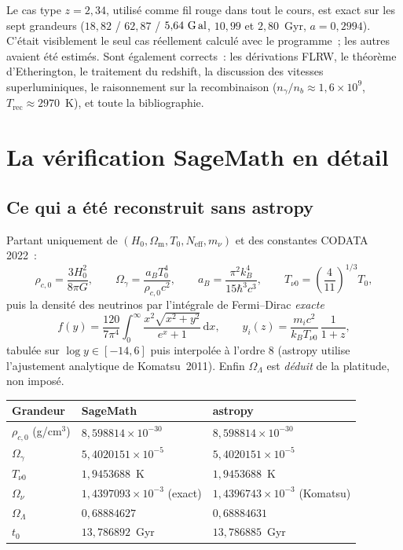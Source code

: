 \documentclass[11pt,a4paper]{report}
\newcommand{\Gly}{\text{G\,al}}
\newcommand{\dif}{\mathrm{d}}
\newcommand{\Om}{\Omega_{\mathrm{m}}}
\newcommand{\OL}{\Omega_{\Lambda}}
\newcommand{\Hzero}{H_{0}}
\begin{document}
\begin{tcolorbox}[ok,title={Ce qui était juste}]
Le cas type $z = 2{,}34$, utilisé comme fil rouge dans tout le cours, est
exact sur les sept grandeurs ($18{,}82$ / $62{,}87$ / $5{,}64~\Gly$, $10{,}99$
et $2{,}80$~Gyr, $a = 0{,}2994$). C'était visiblement le seul cas
réellement calculé avec le programme~; les autres avaient été estimés.
Sont également corrects~: les dérivations FLRW, le théorème d'Etherington, le
traitement du redshift, la discussion des vitesses superluminiques, le
raisonnement sur la recombinaison ($n_{\gamma}/n_{b}\approx1{,}6\times10^{9}$,
$T_{\text{rec}}\approx2970$~K), et toute la bibliographie.
\end{tcolorbox}

\chapter{La vérification SageMath en détail}

\section{Ce qui a été reconstruit sans astropy}

Partant uniquement de $(\Hzero, \Om, T_{0}, N_{\text{eff}}, m_{\nu})$ et des
constantes CODATA 2022~:
\[
\rho_{c,0} = \frac{3\Hzero^{2}}{8\pi G},\qquad
\Omega_{\gamma} = \frac{a_{B}T_{0}^{4}}{\rho_{c,0}c^{2}},\qquad
a_{B} = \frac{\pi^{2}k_{B}^{4}}{15\hbar^{3}c^{3}},\qquad
T_{\nu0} = \left(\frac{4}{11}\right)^{1/3}T_{0},
\]
puis la densité des neutrinos par l'intégrale de Fermi--Dirac \emph{exacte}
\[
f(y) = \frac{120}{7\pi^{4}}\int_{0}^{\infty}
       \frac{x^{2}\sqrt{x^{2}+y^{2}}}{e^{x}+1}\,\dif x ,
\qquad y_{i}(z) = \frac{m_{i}c^{2}}{k_{B}T_{\nu0}}\,\frac{1}{1+z} ,
\]
tabulée sur $\log y \in [-14, 6]$ puis interpolée à l'ordre 8 (astropy utilise
l'ajustement analytique de Komatsu~2011). Enfin $\OL$ est \emph{déduit} de la
platitude, non imposé.

\begin{center}
\renewcommand{\arraystretch}{1.25}
\begin{tabular}{lll}
\toprule
\textbf{Grandeur} & \textbf{SageMath} & \textbf{astropy} \\
\midrule
$\rho_{c,0}$ (g/cm$^{3}$) & $8{,}598814\times10^{-30}$ & $8{,}598814\times10^{-30}$ \\
$\Omega_{\gamma}$ & $5{,}4020151\times10^{-5}$ & $5{,}4020151\times10^{-5}$ \\
$T_{\nu0}$ & $1{,}9453688$~K & $1{,}9453688$~K \\
$\Omega_{\nu}$ & $1{,}4397093\times10^{-3}$ (exact) &
   $1{,}4396743\times10^{-3}$ (Komatsu) \\
$\OL$ & $0{,}68884627$ & $0{,}68884631$ \\
$t_{0}$ & $13{,}786892$~Gyr & $13{,}786885$~Gyr \\
\bottomrule
\end{tabular}
\end{center}
\end{document}
